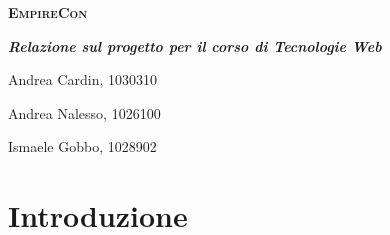 \documentclass[12pt,a4paper]{article}
\begin{document}
\begin{titlepage}
	\centering
	\vspace*{4.5cm}
	{\scshape\LARGE \textbf{EmpireCon} \par}
	\vspace{0.5cm}
	{\Large \textbf{\textit{Relazione sul progetto per il corso di Tecnologie Web}}\par}
	\vspace{1cm}
	{\Large Andrea Cardin, 1030310\par}
	{\Large Andrea Nalesso, 1026100\par}
	{\Large Ismaele Gobbo, 1028902\par}
	\vspace*{\fill}
\end{titlepage}

\tableofcontents
\newpage

% 
% 

\section{Introduzione}

\newpage
\end{document}
